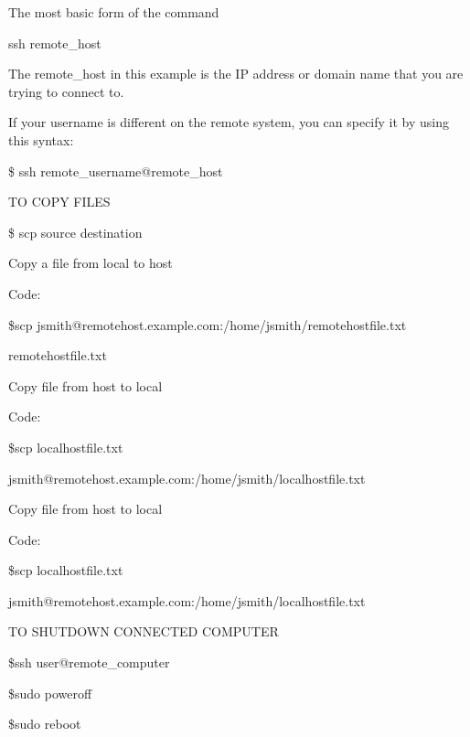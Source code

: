 \documentclass{article}
\begin{document}
The most basic form of the command 

\hspace{10mm}ssh remote\_host

\hspace{10mm}The remote\_host in this example is the IP address or domain name that you are trying to connect to.

\hspace{10mm}If your username is different on the remote system, you can specify it by using this syntax:

\hspace{10mm} \$ ssh remote\_username@remote\_host

TO COPY FILES

\hspace{10mm} \$ scp source destination

Copy a file from local to host

\hspace{10mm}Code:

\hspace{10mm}\$scp jsmith@remotehost.example.com:/home/jsmith/remotehostfile.txt

\hspace{10mm}remotehostfile.txt

Copy file from host to local

\hspace{10mm}Code:

\hspace{10mm}\$scp localhostfile.txt

\hspace{10mm}jsmith@remotehost.example.com:/home/jsmith/localhostfile.txt

Copy file from host to local

\hspace{10mm}Code:

\hspace{10mm}\$scp localhostfile.txt

\hspace{10mm}jsmith@remotehost.example.com:/home/jsmith/localhostfile.txt

TO SHUTDOWN CONNECTED COMPUTER 
		
		\hspace{10mm}\$ssh user@remote\_computer
		
		\hspace{10mm}\$sudo poweroff
		
		\hspace{10mm}\$sudo reboot 
\end{document}
